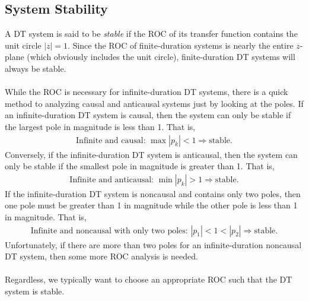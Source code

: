 \documentclass{report}
\begin{document}
\subsection{System Stability}
A DT system is said to be \emph{stable} if the ROC of its transfer function contains the unit circle $|z|=1$. Since the ROC of finite-duration systems is 
nearly the entire $z$-plane (which obviously includes the unit circle), finite-duration DT systems will always be stable. 
\\ \\
While the ROC is necessary for infinite-duration DT systems, there is a quick method to analyzing causal and anticausal systems just by looking at the poles. 
If an infinite-duration DT system is causal, then the system can only be stable if the largest pole in magnitude is less than 1. That is, 
\begin{align}
    \text{Infinite and causal: } \max|p_k| < 1 \Longrightarrow \text{stable}.
\end{align}
Conversely, if the infinite-duration DT system is anticausal, then 
the system can only be stable if the smallest pole in magnitude is greater than 1. That is,
\begin{align}
    \text{Infinite and anticausal: } \min|p_k| > 1 \Longrightarrow \text{stable}.
\end{align}
If the infinite-duration DT system is noncausal and contains only two poles, then one pole must be greater than 1 in magnitude while the other pole is less than 1 in magnitude. That is, 
\begin{align}
    \text{Infinite and noncausal with only two poles: } |p_1| < 1 < |p_2| \Longrightarrow \text{stable}.
\end{align}
Unfortunately, if there are more than two poles for an infinite-duration noncausal DT system, then some more ROC analysis is needed.
\\ \\
Regardless, we typically want to choose an appropriate ROC such that the DT system is stable. 
\end{document}
